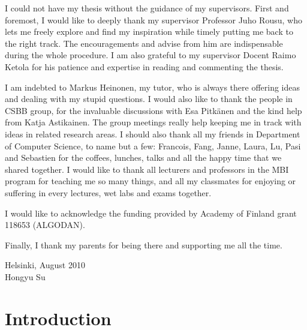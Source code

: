 \documentclass[english]{tktltiki}
\begin{document}
I could not have my thesis without the guidance of my supervisors. First and foremost, I would like to deeply thank my supervisor Professor Juho Rousu, who lets me freely explore and find my inspiration while timely putting me back to the right track. The encouragements and advise from him are indispensable during the whole procedure. I am also grateful to my supervisor Docent Raimo Ketola for his patience and expertise in reading and commenting the thesis.

I am indebted to Markus Heinonen, my tutor, who is always there offering ideas and dealing with my stupid questions. I would also like to thank the people in CSBB group, for the invaluable discussions with Esa Pitk{\"a}nen and the kind help from Katja Astikainen. The group meetings really help keeping me in track with ideas in related research areas. I should also thank all my friends in Department of Computer Science, to name but a few: Francois, Fang, Janne, Laura, Lu, Pasi and Sebastien for the coffees, lunches, talks and all the happy time that we shared together. I would like to thank all lecturers and professors in the MBI program for teaching me so many things, and all my classmates for enjoying or suffering in every lectures, wet labs and exams together. 

I would like to acknowledge the funding provided by Academy of Finland grant 118653 (ALGODAN).

Finally, I thank my parents for being there and supporting me all the time.



\begin{flushright}
\onehalfspacing
Helsinki, August 2010\\
Hongyu Su \,
\end{flushright}



%
%
\clearpage
\mytableofcontents


%
%


%
%
\clearpage
\section{Introduction}
\end{document}
